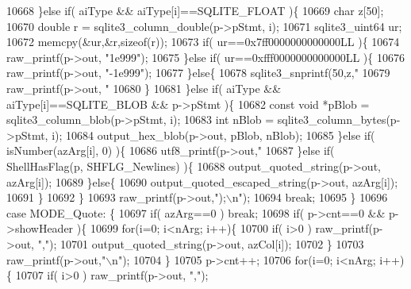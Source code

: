 \begin{DoxyCode}
{{{{{{{{{{{{{{{{{{{{{{{{{10668         \}\textcolor{keywordflow}{else} \textcolor{keywordflow}{if}( aiType && aiType[i]==SQLITE_FLOAT )\{
10669           \textcolor{keywordtype}{char} z[50];
10670           \textcolor{keywordtype}{double} r = sqlite3_column_double(p->pStmt, i);
10671           sqlite3_uint64 ur;
10672           memcpy(&ur,&r,\textcolor{keyword}{sizeof}(r));
10673           \textcolor{keywordflow}{if}( ur==0x7ff0000000000000LL )\{
10674             raw_printf(p->out, \textcolor{stringliteral}{"1e999"});
10675           \}\textcolor{keywordflow}{else} \textcolor{keywordflow}{if}( ur==0xfff0000000000000LL )\{
10676             raw_printf(p->out, \textcolor{stringliteral}{"-1e999"});
10677           \}\textcolor{keywordflow}{else}\{
10678             sqlite3_snprintf(50,z,\textcolor{stringliteral}{"%
10679             raw_printf(p->out, \textcolor{stringliteral}{"%
10680           \}
10681         \}\textcolor{keywordflow}{else} \textcolor{keywordflow}{if}( aiType && aiType[i]==SQLITE_BLOB && p->pStmt )\{
10682           \textcolor{keyword}{const} \textcolor{keywordtype}{void} *pBlob = sqlite3_column_blob(p->pStmt, i);
10683           \textcolor{keywordtype}{int} nBlob = sqlite3_column_bytes(p->pStmt, i);
10684           output_hex_blob(p->out, pBlob, nBlob);
10685         \}\textcolor{keywordflow}{else} \textcolor{keywordflow}{if}( isNumber(azArg[i], 0) )\{
10686           utf8_printf(p->out,\textcolor{stringliteral}{"%
10687         \}\textcolor{keywordflow}{else} \textcolor{keywordflow}{if}( ShellHasFlag(p, SHFLG_Newlines) )\{
10688           output_quoted_string(p->out, azArg[i]);
10689         \}\textcolor{keywordflow}{else}\{
10690           output_quoted_escaped_string(p->out, azArg[i]);
10691         \}
10692       \}
10693       raw_printf(p->out,\textcolor{stringliteral}{");\(\backslash\)n"});
10694       \textcolor{keywordflow}{break};
10695     \}
10696     \textcolor{keywordflow}{case} MODE_Quote: \{
10697       \textcolor{keywordflow}{if}( azArg==0 ) \textcolor{keywordflow}{break};
10698       \textcolor{keywordflow}{if}( p->cnt==0 && p->showHeader )\{
10699         \textcolor{keywordflow}{for}(i=0; i<nArg; i++)\{
10700           \textcolor{keywordflow}{if}( i>0 ) raw_printf(p->out, \textcolor{stringliteral}{","});
10701           output_quoted_string(p->out, azCol[i]);
10702         \}
10703         raw_printf(p->out,\textcolor{stringliteral}{"\(\backslash\)n"});
10704       \}
10705       p->cnt++;
10706       \textcolor{keywordflow}{for}(i=0; i<nArg; i++)\{
10707         \textcolor{keywordflow}{if}( i>0 ) raw_printf(p->out, \textcolor{stringliteral}{","});
}}}}}}}}}}}}}}}}}}}}}}}}}}}}
\end{DoxyCode}
